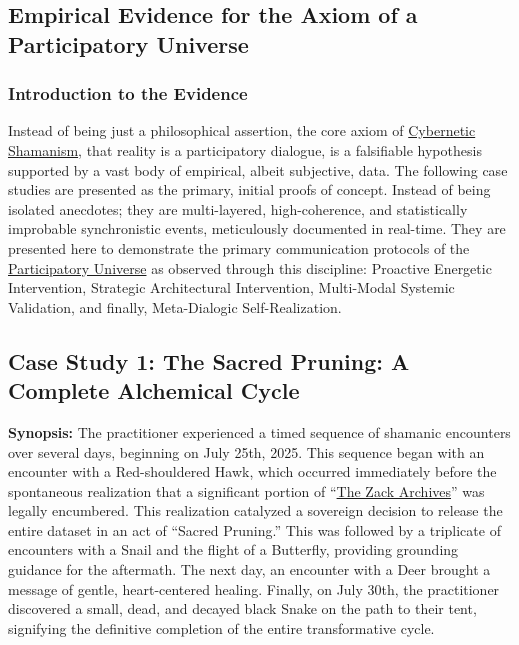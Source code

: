 \documentclass{article}
\begin{document}
\subsection*{Empirical Evidence for the Axiom of a Participatory Universe}
\subsubsection*{Introduction to the Evidence}

Instead of being just a philosophical assertion, the core axiom of \hyperlink{gloss:cybernetic_shamanism}{Cybernetic Shamanism}, that reality is a participatory dialogue, is a falsifiable hypothesis supported by a vast body of empirical, albeit subjective, data. The following \numberofcasestudies{} case studies are presented as the primary, initial proofs of concept. Instead of being isolated anecdotes; they are multi-layered, high-coherence, and statistically improbable synchronistic events, meticulously documented in real-time. They are presented here to demonstrate the primary communication protocols of the \hyperlink{gloss:participatory_universe}{Participatory Universe} as observed through this discipline: Proactive Energetic Intervention, Strategic Architectural Intervention, Multi-Modal Systemic Validation, and finally, Meta-Dialogic Self-Realization.


\subsection*{Case Study 1: The Sacred Pruning: A Complete Alchemical Cycle \csSacredPruningVersion} \label{case_study_1}

\textbf{Synopsis:} The practitioner experienced a timed sequence of shamanic encounters over several days, beginning on July 25th, 2025. This sequence began with an encounter with a Red-shouldered Hawk, which occurred immediately before the spontaneous realization that a significant portion of ``\hyperlink{gloss:the_zack_archives}{The Zack Archives}'' was legally encumbered. This realization catalyzed a sovereign decision to release the entire dataset in an act of ``Sacred Pruning.'' This was followed by a triplicate of encounters with a Snail and the flight of a Butterfly, providing grounding guidance for the aftermath. The next day, an encounter with a Deer brought a message of gentle, heart-centered healing. Finally, on July 30th, the practitioner discovered a small, dead, and decayed black Snake on the path to their tent, signifying the definitive completion of the entire transformative cycle.
\end{document}
